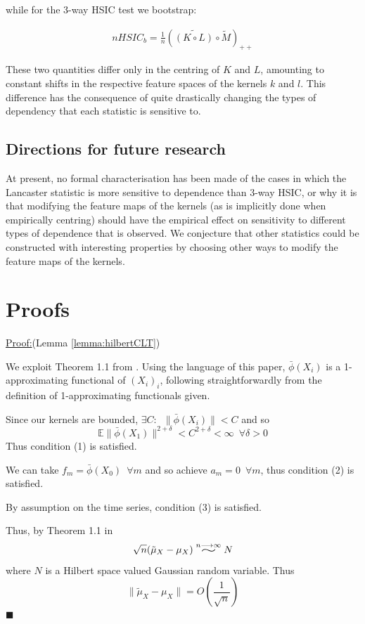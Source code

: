 \documentclass[]{article}
\newenvironment{claimproof}[1]{\par\noindent\underline{Proof:}\space#1}{\hfill $\blacksquare$}
\newcommand{\widesim}[2][1.5]{
  \mathrel{\overset{#2}{\scalebox{#1}[1]{$\sim$}}}}
\begin{document}
while for the 3-way HSIC test we bootstrap:

\begin{align*}
nHSIC_b = \frac{1}{n}\left(\widetilde{\left( K \circ L\right) }\circ \tilde{M} \right)_{++}
\end{align*}

These two quantities differ only in the centring of $K$ and $L$, amounting to constant shifts in the respective feature spaces of the kernels $k$ and $l$. This difference has the consequence of quite drastically changing the types of dependency that each statistic is sensitive to.

\subsection{Directions for future research}

At present, no formal characterisation has been made of the cases in which the Lancaster statistic is more sensitive to dependence than 3-way HSIC, or why it is that modifying the feature maps of the kernels (as is implicitly done when empirically centring) should have the empirical effect on sensitivity to different types of dependence that is observed. We conjecture that other statistics could be constructed with interesting properties by choosing other ways to modify the feature maps of the kernels.

\section{Proofs}

\begin{claimproof}(Lemma \ref{lemma:hilbertCLT})

We exploit Theorem 1.1 from \cite{dehling2015bootstrap}. Using the language of this paper, $\bar{\phi}(X_i)$ is a 1-approximating functional of $(X_i)_i$, following straightforwardly from the definition of 1-approximating functionals given. 

Since our kernels are bounded, $\exists C: \enspace \|\bar{\phi}(X_i)\| < C $ and so \[\mathbb{E}\|\bar{\phi}(X_1)\|^{2+\delta} <C^{2+\delta}< \infty \enspace \forall \delta>0\]
Thus condition (1) is satisfied.

We can take $f_m = \bar{\phi}(X_0)\enspace \forall m$ and so achieve $a_m= 0 \enspace \forall m$, thus condition (2) is satisfied.

By assumption on the time series, condition (3) is satisfied.

Thus, by Theorem 1.1 in \cite{dehling2015bootstrap}
\[\sqrt{n} (\tilde{\mu}_{X} - \mu_{X}) \widesim[2]{n\longrightarrow\infty} N\]
where $N$ is a Hilbert space valued Gaussian random variable. Thus 
\[\|\tilde{\mu}_{X} - \mu_{X}\| = O(\frac{1}{\sqrt{n}})\]
\end{claimproof}
\end{document}
